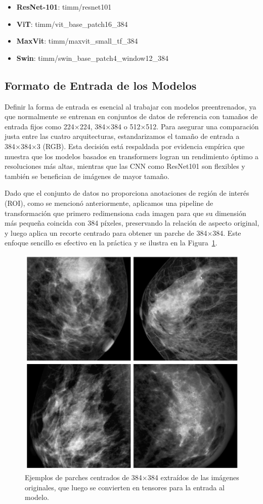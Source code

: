 \documentclass[a4paper,10pt]{book}
\begin{document}
\begin{itemize}
    \item \textbf{ResNet-101}: timm/resnet101
    \item \textbf{ViT}: timm/vit\_base\_patch16\_384
    \item \textbf{MaxVit}: timm/maxvit\_small\_tf\_384
    \item \textbf{Swin}: timm/swin\_base\_patch4\_window12\_384
\end{itemize}

\subsection{Formato de Entrada de los Modelos}

Definir la forma de entrada es esencial al trabajar con modelos preentrenados, ya que normalmente se entrenan en conjuntos de datos de referencia con tamaños de entrada fijos como 224×224, 384×384 o 512×512. Para asegurar una comparación justa entre las cuatro arquitecturas, estandarizamos el tamaño de entrada a 384×384×3 (RGB). Esta decisión está respaldada por evidencia empírica que muestra que los modelos basados en transformers logran un rendimiento óptimo a resoluciones más altas, mientras que las CNN como ResNet101 son flexibles y también se benefician de imágenes de mayor tamaño.

Dado que el conjunto de datos no proporciona anotaciones de región de interés (ROI), como se mencionó anteriormente, aplicamos una pipeline de transformación que primero redimensiona cada imagen para que su dimensión más pequeña coincida con 384 píxeles, preservando la relación de aspecto original, y luego aplica un recorte centrado para obtener un parche de 384×384. Este enfoque sencillo es efectivo en la práctica y se ilustra en la Figura~\ref{fig:384_patches}.

\begin{figure}[h!]
    \centering
    \includegraphics[width=0.3\linewidth]{reports//assets/384patchs.png}
    \caption[Parche de entrada 384×384]{Ejemplos de parches centrados de 384×384 extraídos de las imágenes originales, que luego se convierten en tensores para la entrada al modelo.}
    \label{fig:384_patches}
\end{figure}
\end{document}
